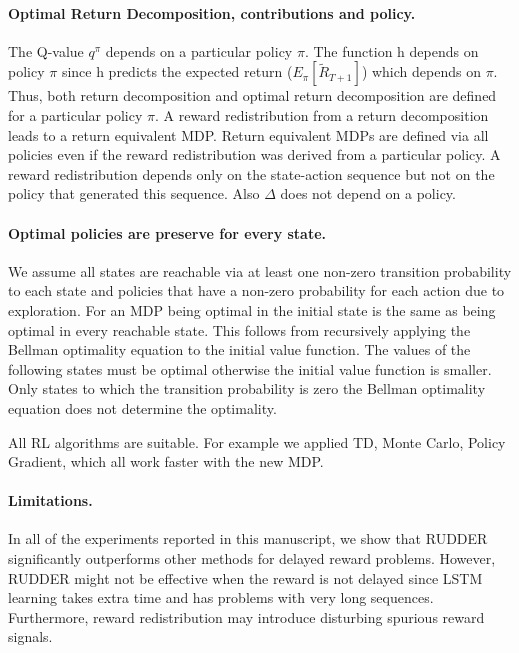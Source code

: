 \documentclass{article}
\begin{document}
\begin{appendices}
\paragraph{Optimal Return Decomposition, contributions and policy.} The Q-value $q^\pi$ depends on a particular policy $\pi$. 
The function h depends on policy $\pi$ since 
h predicts the expected return ($E_{\pi}[\tilde R_{T+1}]$) 
which depends on $\pi$. 
Thus, both return decomposition and optimal return decomposition 
are defined for a particular policy $\pi$. 
A reward redistribution from a return decomposition 
leads to a return equivalent MDP. 
Return equivalent MDPs are defined via all policies 
even if the reward redistribution was derived from a particular policy. 
A reward redistribution depends only on the state-action sequence 
but not on the policy that generated this sequence. 
Also $\Delta$ does not depend on a policy.


\paragraph{Optimal policies are preserve for every state.}
We assume all states are reachable via at least one non-zero transition probability 
to each state and policies that have a non-zero probability 
for each action due to exploration. 
For an MDP being optimal in the initial state 
is the same as being optimal in every reachable state. 
This follows from recursively applying the Bellman optimality equation 
to the initial value function. 
The values of the following states must be optimal 
otherwise the initial value function is smaller. 
Only states to which the transition probability is zero 
the Bellman optimality equation does not determine the optimality.

All RL algorithms are suitable. 
For example we applied TD, Monte Carlo, Policy Gradient, 
which all work faster with the new MDP.

\paragraph{Limitations.}
In all of the experiments reported in this manuscript, we show that RUDDER significantly outperforms other methods for delayed reward problems. However, RUDDER might not be effective when the reward is not delayed since LSTM learning takes extra time and has problems with very long sequences. Furthermore, reward redistribution may introduce disturbing spurious reward signals.



\end{appendices}
\end{document}
